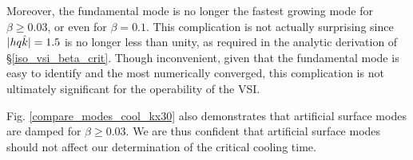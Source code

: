 Moreover, the fundamental mode is no longer the fastest growing mode for $\beta \geq 0.03$, or even 
for $\beta = 0.1$.  This complication is not actually surprising since $|hq\hat{k}| = 1.5$ is no longer less than unity,
as required in the analytic derivation of \S\ref{iso_vsi_beta_crit}.  Though  inconvenient,  given that the 
fundamental mode is easy to identify and the most numerically converged, this complication is not ultimately significant
for the operability of the VSI.  

Fig. \ref{compare_modes_cool_kx30} also demonstrates that artificial surface modes are damped for $\beta \geq 0.03$.
We are thus confident that artificial surface modes should not affect our determination of the critical cooling time.


%

